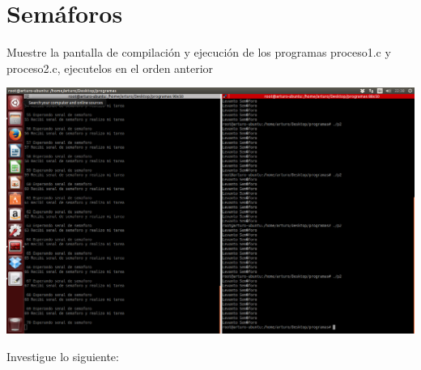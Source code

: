 \section{Semáforos}

	Muestre la pantalla de compilación y ejecución de los programas proceso1.c y proceso2.c, ejecutelos en el orden anterior

	\begin{center}
		\includegraphics[width=\linewidth]{imagenes/pic.png}
	\end{center}

Investigue lo siguiente:

